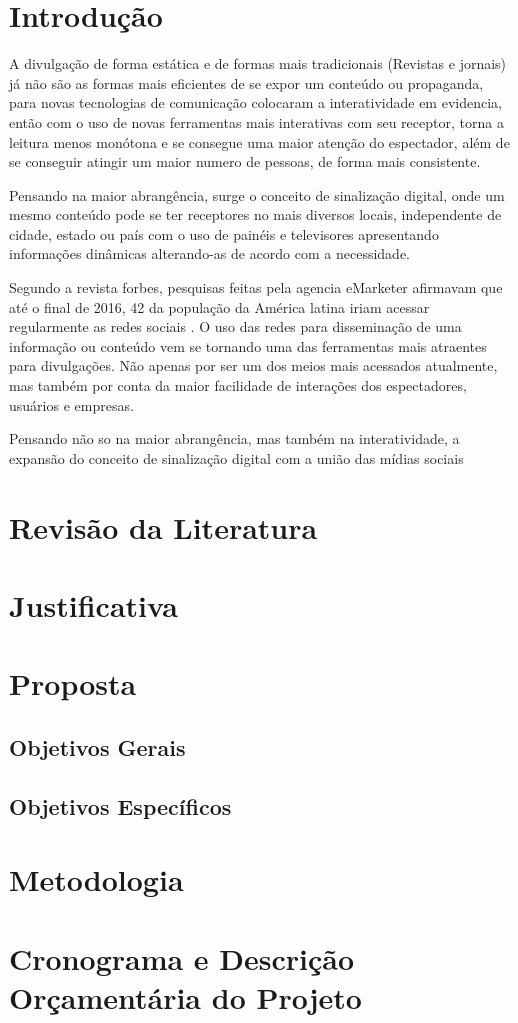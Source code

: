 \documentclass[
	12pt,				%
	openright,			%
	oneside,			%
	a4paper,			%
	english,			%
	french,				%
	spanish,			%
	brazil,				%
	]{abntex2}
\begin{document}
\frenchspacing 
\imprimircapa
\imprimirfolhaderosto*




\section*{Introdução}
	A divulgação de forma estática e de formas mais tradicionais (Revistas e jornais) já não são as formas mais eficientes de se expor um conteúdo ou propaganda, para \cite{escobar2007} novas tecnologias de comunicação colocaram a interatividade em evidencia, então com o uso de novas ferramentas mais interativas com seu receptor, torna a leitura menos monótona e se consegue uma maior atenção do espectador, além de se conseguir atingir um maior numero de pessoas, de forma mais consistente.
	
	Pensando na maior abrangência, surge o conceito de sinalização digital, onde um mesmo conteúdo pode se ter receptores no mais diversos locais, independente de cidade, estado ou país com o uso de painéis e televisores apresentando informações dinâmicas alterando-as de acordo com a necessidade.
	
	Segundo a revista forbes, pesquisas feitas pela agencia eMarketer afirmavam que até o final de 2016, 42 da população da América latina iriam acessar regularmente as redes sociais \cite{forbes2016}. O uso das redes para disseminação de uma informação ou conteúdo vem se tornando uma das ferramentas mais atraentes para divulgações. Não apenas por ser um dos meios mais acessados atualmente, mas também por conta da maior facilidade de interações dos espectadores, usuários e empresas.
	
	Pensando não so na maior abrangência, mas também na interatividade, a expansão do conceito de sinalização digital com a união das mídias sociais
	
\section*{Revisão da Literatura}



\section*{Justificativa}

\section*{Proposta}

\subsection*{Objetivos Gerais}
\subsection*{Objetivos Específicos}
\section*{Metodologia}
\section*{Cronograma e Descrição Orçamentária do Projeto}

\end{document}
